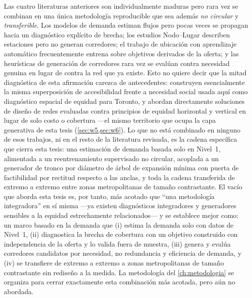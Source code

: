 Las cuatro literaturas anteriores son individualmente maduras pero rara vez se combinan en
una única metodología reproducible que sea además \emph{no circular} y \emph{transferible}.
Los modelos de demanda estiman flujos pero pocas veces se propagan hacia un diagnóstico
explícito de brecha; los estudios Nodo--Lugar describen estaciones pero no generan
corredores; el trabajo de ubicación con aprendizaje automático frecuentemente entrena sobre
objetivos derivados de la oferta; y las heurísticas de generación de corredores rara vez se
evalúan contra necesidad genuina en lugar de contra la red que ya existe. Esto no quiere
decir que la mitad diagnóstica de esta afirmación carezca de antecedentes:
\textcite{foth2013equitable} construyen esencialmente la misma superposición de
accesibilidad frente a necesidad social usada aquí como diagnóstico espacial de equidad
para Toronto, y \textcite{camporeale2019equity} abordan directamente soluciones de diseño
de redes evaluadas contra principios de equidad horizontal y vertical en lugar de solo
costo o cobertura ---el mismo territorio que ocupa la capa generativa de esta tesis
(\cref{sec:w5,sec:w6}). Lo que no está combinado en ninguno de esos trabajos, ni en el
resto de la literatura revisada, es la cadena específica que cierra esta tesis: una
estimación de demanda basada solo en Nivel~1, alimentada a un reentrenamiento supervisado
no circular, acoplada a un generador de tronco por diámetro de árbol de expansión mínima
con puerta de factibilidad por rectitud respecto a las anclas, y toda la cadena
transferida de extremo a extremo entre zonas metropolitanas de tamaño contrastante. El
vacío que aborda esta tesis es, por tanto, más acotado que ``una metodología
integradora'' en sí misma ---ya existen diagnósticos integradores y generadores
sensibles a la equidad estrechamente relacionados--- y se establece mejor como: un marco
basado en la demanda
que (i) estima la demanda solo con datos de Nivel~1, (ii) diagnostica la brecha de
cobertura con un objetivo construido con independencia de la oferta y lo valida fuera de
muestra, (iii) genera y evalúa corredores candidatos por necesidad, no redundancia y
eficiencia de demanda, y (iv) se transfiere de extremo a extremo a zonas metropolitanas de
tamaño contrastante sin rediseño a la medida. La metodología del \cref{ch:metodologia} se
organiza para cerrar exactamente esta combinación más acotada, pero aún no abordada.
